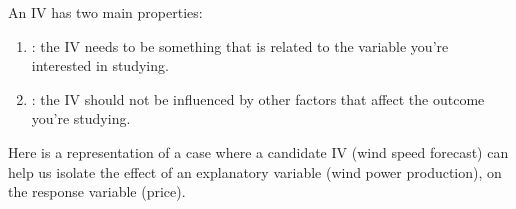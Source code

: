 \documentclass[letterpaper,10pt,english]{jupyterBook}
\begin{document}
\sphinxAtStartPar
An IV has two main properties:
\begin{enumerate}
%
\item {} 
\sphinxAtStartPar
{}: the IV needs to be something that is related to the variable you’re interested in studying.

\item {} 
\sphinxAtStartPar
{}: the IV should not be influenced by other factors that affect the outcome you’re studying.

\end{enumerate}

\sphinxAtStartPar
Here is a representation of a case where a candidate IV (wind speed forecast) can help us isolate the effect of an explanatory variable (wind power production), on the response variable (price).
\end{document}
